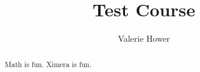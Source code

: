 \documentclass{xourse}
\title{Test Course}
\author{Valerie Hower}
\begin{document}
\begin{abstract}
Math is fun.  Ximera is fun.
\end{abstract}
\maketitle

\setcounter{tocdepth}{2}

\chapterstyle
{} %
\end{document}
